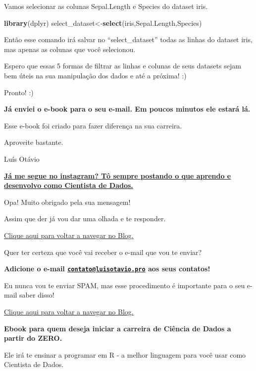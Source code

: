 \documentclass[
]{book}
\newenvironment{Shaded}{\begin{snugshade}}{\end{snugshade}}
\newcommand{\KeywordTok}[1]{\textcolor[rgb]{0.13,0.29,0.53}{\textbf{#1}}}
\newcommand{\NormalTok}[1]{#1}
\begin{document}
Vamos selecionar as colunas Sepal.Length e Species do dataset iris.

\begin{Shaded}
\begin{Highlighting}[]
\KeywordTok{library}\NormalTok{(dplyr)}
\NormalTok{select_dataset<-}\KeywordTok{select}\NormalTok{(iris,Sepal.Length,Species)}
\end{Highlighting}
\end{Shaded}

Então esse comando irá salvar no ``select\_dataset'' todas as linhas do
dataset iris, mas apenas as colunas que você selecionou.

Espero que essas 5 formas de filtrar as linhas e colunas de seus
datasets sejam bem úteis na sua manipulação dos dados e até a próxima!
:)

Pronto! :)

\textbf{Já enviei o e-book para o seu e-mail. Em poucos minutos ele
estará lá.}

Esse e-book foi criado para fazer diferença na sua carreira.

Aproveite bastante.

Luís Otávio

\href{https://www.instagram.com/_u/luisotavio.pro}{\textbf{Já me segue
no instagram? Tô sempre postando o que aprendo e desenvolvo como
Cientista de Dados.}}

Opa! Muito obrigado pela sua mensagem!

Assim que der já vou dar uma olhada e te responder.

\href{https://luisotavio.pro/}{Clique aqui para voltar a navegar no
Blog.}

Quer ter certeza que você vai receber o e-mail que vou te enviar?

\textbf{Adicione o e-mail
\href{mailto:contato@luisotavio.pro}{\nolinkurl{contato@luisotavio.pro}}
aos seus contatos!}

Eu nunca vou te enviar SPAM, mas esse procedimento é importante para o
seu e-mail saber disso!

\href{https://luisotavio.pro/}{Clique aqui para voltar a navegar no
Blog.}

\textbf{Ebook para quem deseja iniciar a carreira de Ciência de Dados a
partir do ZERO.}

Ele irá te ensinar a programar em R - a melhor linguagem para você usar
como Cientista de Dados.
\end{document}
